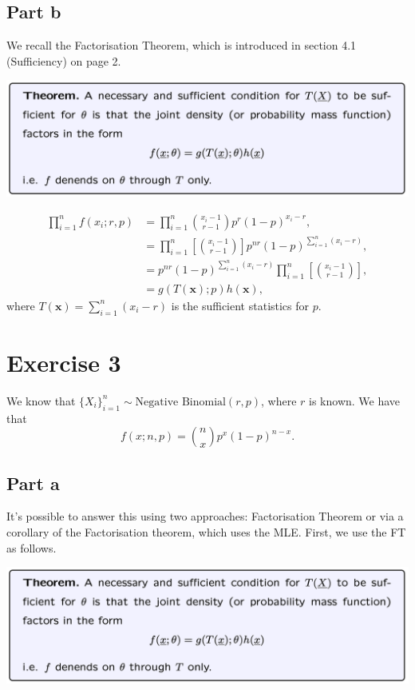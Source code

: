\documentclass[12pt]{article}
\begin{document}
\subsection{Part b}
We recall the Factorisation Theorem, which is introduced in section 4.1 (Sufficiency) on page 2.

\includegraphics[width=1\linewidth]{Factorisation_theorem.png}

\begin{align}
\prod_{i=1}^{n} f(x_{i}; r, p) & = \prod_{i=1}^{n} {x_{i}-1 \choose r - 1}p^{r} (1-p)^{x_{i}-r}, \\
& = \prod_{i=1}^{n} \left[ {x_{i}-1 \choose r - 1} \right] p^{n r} (1-p)^{\sum_{i=1}^{n} (x_{i}-r)}, \\
& = p^{n r} (1-p)^{\sum_{i=1}^{n} (x_{i}-r)} \prod_{i=1}^{n} \left[ {x_{i}-1 \choose r - 1} \right], \\
& = g(T(\textbf{x}); p) h(\textbf{x}),
\end{align}
where $T(\textbf{x}) = \sum_{i=1}^{n} (x_{i}-r)$ is the sufficient statistics for $p$.

\section*{Exercise 3}

We know that $\{X_{i}\}_{i=1}^{n} \sim \mbox{Negative Binomial}(r, p)$, where $r$ is known. We have that
\begin{equation}
f(x; n, p) = {n \choose x}p^{x} (1-p)^{n-x}.
\end{equation}

\subsection*{Part a}
It's possible to answer this using two approaches: Factorisation Theorem or via a corollary of the Factorisation theorem, which uses the MLE. First, we use the FT as follows.

\includegraphics[width=1\linewidth]{Factorisation_theorem.png}
\end{document}
